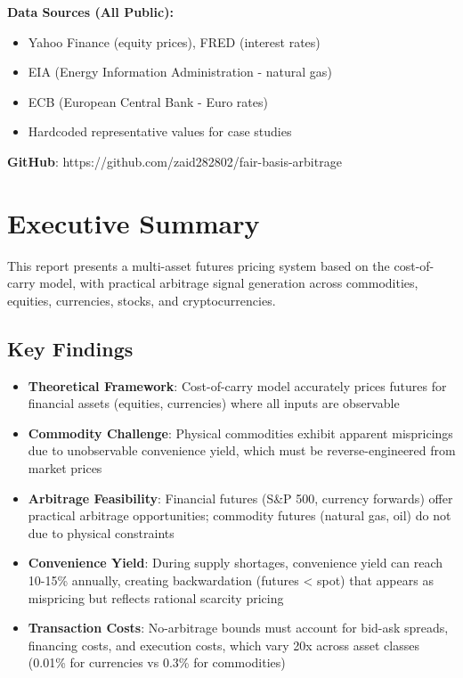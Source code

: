 \documentclass[12pt,a4paper]{article}
\begin{document}
\textbf{Data Sources (All Public):}
\begin{itemize}[leftmargin=*]
    \item Yahoo Finance (equity prices), FRED (interest rates)
    \item EIA (Energy Information Administration - natural gas)
    \item ECB (European Central Bank - Euro rates)
    \item Hardcoded representative values for case studies
\end{itemize}

\vfill

\textbf{GitHub}: https://github.com/zaid282802/fair-basis-arbitrage

\newpage
\tableofcontents
\newpage

\section{Executive Summary}

This report presents a multi-asset futures pricing system based on the cost-of-carry model, with practical arbitrage signal generation across commodities, equities, currencies, stocks, and cryptocurrencies.

\subsection{Key Findings}

\begin{itemize}[leftmargin=*]
    \item \textbf{Theoretical Framework}: Cost-of-carry model accurately prices futures for financial assets (equities, currencies) where all inputs are observable

    \item \textbf{Commodity Challenge}: Physical commodities exhibit apparent mispricings due to unobservable convenience yield, which must be reverse-engineered from market prices

    \item \textbf{Arbitrage Feasibility}: Financial futures (S\&P 500, currency forwards) offer practical arbitrage opportunities; commodity futures (natural gas, oil) do not due to physical constraints

    \item \textbf{Convenience Yield}: During supply shortages, convenience yield can reach 10-15\% annually, creating backwardation (futures < spot) that appears as mispricing but reflects rational scarcity pricing

    \item \textbf{Transaction Costs}: No-arbitrage bounds must account for bid-ask spreads, financing costs, and execution costs, which vary 20x across asset classes (0.01\% for currencies vs 0.3\% for commodities)
\end{itemize}
\end{document}
